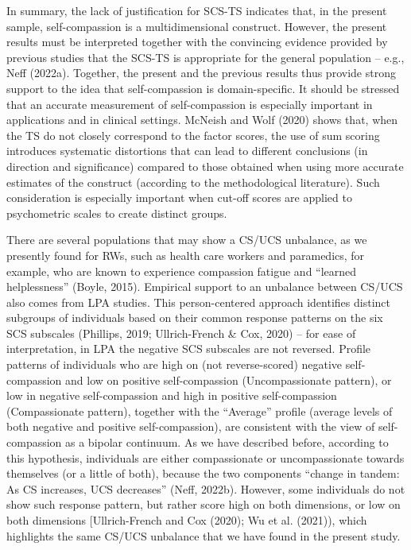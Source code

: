 \documentclass[
  man]{apa7}
\begin{document}
In summary, the lack of justification for SCS-TS indicates that, in the present sample, self-compassion is a multidimensional construct. However, the present results must be interpreted together with the convincing evidence provided by previous studies that the SCS-TS is appropriate for the general population -- e.g., Neff (2022a). Together, the present and the previous results thus provide strong support to the idea that self-compassion is domain-specific. It should be stressed that an accurate measurement of self-compassion is especially important in applications and in clinical settings. McNeish and Wolf (2020) shows that, when the TS do not closely correspond to the factor scores, the use of sum scoring introduces systematic distortions that can lead to different conclusions (in direction and significance) compared to those obtained when using more accurate estimates of the construct (according to the methodological literature). Such consideration is especially important when cut-off scores are applied to psychometric scales to create distinct groups.

There are several populations that may show a CS/UCS unbalance, as we presently found for RWs, such as health care workers and paramedics, for example, who are known to experience compassion fatigue and ``learned helplessness'' (Boyle, 2015). Empirical support to an unbalance between CS/UCS also comes from LPA studies. This person-centered approach identifies distinct subgroups of individuals based on their common response patterns on the six SCS subscales (Phillips, 2019; Ullrich-French \& Cox, 2020) -- for ease of interpretation, in LPA the negative SCS subscales are not reversed. Profile patterns of individuals who are high on (not reverse-scored) negative self-compassion and low on positive self-compassion (Uncompassionate pattern), or low in negative self-compassion and high in positive self-compassion (Compassionate pattern), together with the ``Average'' profile (average levels of both negative and positive self-compassion), are consistent with the view of self-compassion as a bipolar continuum. As we have described before, according to this hypothesis, individuals are either compassionate or uncompassionate towards themselves (or a little of both), because the two components ``change in tandem: As CS increases, UCS decreases'' (Neff, 2022b). However, some individuals do not show such response pattern, but rather score high on both dimensions, or low on both dimensions {[}Ullrich-French and Cox (2020); Wu et al. (2021)), which highlights the same CS/UCS unbalance that we have found in the present study.
\end{document}
